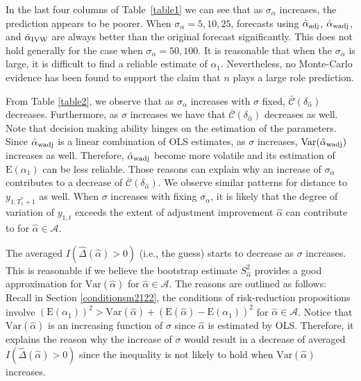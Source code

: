 \documentclass[11pt,3p,review,authoryear]{elsarticle}
\def\mc#1{\mathcal{#1}} %
\def\E#1{\mathrm{E}(#1)} %
\def\var#1{\mathrm{Var}(#1)} %
\theoremstyle{definition}
\begin{document}
In the last four columns of Table~\ref{table1} we can see that as $\sigma_{\alpha}$ increases, the prediction appears to be poorer. When $\sigma_{\alpha}= 5, 10, 25$, forecasts using $\hat{\alpha}_{\rm adj}$, $\hat{\alpha}_{\rm wadj}$, and $\hat{\alpha}_{\rm IVW}$ are always better than the original forecast significantly. This does not hold generally for the case when $\sigma_{\alpha}=50, 100$. It is reasonable that when the $\sigma_{\alpha}$ is large, it is difficult to find a reliable estimate of $\alpha_1$.  Nevertheless, no Monte-Carlo evidence has been found to support the claim that $n$ plays a large role prediction. 

From Table \ref{table2}, we observe that as $\sigma_{\alpha}$ increases with $\sigma$ fixed, $\bar{\mc{C}}(\delta_{\hat{\alpha}})$ decreases. Furthermore, as $\sigma$ increases we have that $\bar{\mc{C}}(\delta_{\hat{\alpha}})$ decreases as well. Note that decision making ability hinges on the estimation of the parameters. Since $\hat{\alpha}_{\rm wadj}$  is a linear combination of OLS estimates, as $\sigma$ increases, $\var{\hat{\alpha}_{\rm wadj}}$ increases as well. Therefore, $\hat{\alpha}_{\rm wadj}$ become more volatile and its estimation of $\E{\alpha_1}$ can be less reliable. Those reasons can explain  why an increase of $\sigma_{\alpha}$ contributes to a decrease of  $\bar{\mc{C}}(\delta_{\hat{\alpha}})$.  We observe similar patterns for distance to $y_{1, T_1^*+1}$ as well. When $\sigma$ increases with fixing $\sigma_{\alpha}$, it is likely that the degree of variation of $y_{1,t}$ exceeds the extent of adjustment improvement $\hat{\alpha}$ can contribute to for $\hat{\alpha}\in \mc{A}$.

The averaged $I(\hat{\Delta}(\hat{\alpha})>0)$ (i.e., the guess) starts to decrease as $\sigma$ increases. This is reasonable if we believe the bootstrap estimate $S^2_{\hat{\alpha}}$ provides a good approximation for $\var{\hat{\alpha}}$ for $\hat{\alpha}\in \mc{A}$. The reasons are outlined as follows: Recall in Section \ref{conditionsm2122}, the conditions of risk-reduction propositions involve $(\E{\alpha_1})^2 > \var{\hat{\alpha}} + (\E{\hat{\alpha}}-\E{\alpha_1})^2$ for $\hat{\alpha}\in \mc{A}$. Notice that $\var{\hat{\alpha}}$ is an increasing function of $\sigma$ since $\hat{\alpha}$ is estimated by OLS. Therefore, it explains the reason why the increase of $\sigma$ would result in a decrease of averaged $I(\hat{\Delta}(\hat{\alpha})>0)$ since the inequality is not likely to hold when  $\var{\hat{\alpha}}$ increases.
\end{document}
